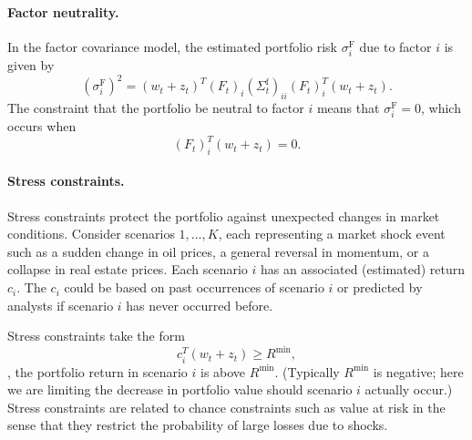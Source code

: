 \documentclass[openany]{article}  %
\newcommand{\cov}{\mathbf{cov}}
\begin{document}
\paragraph{Factor neutrality.}
In the factor covariance model, the estimated
portfolio risk $\sigma^\mathrm{F}_i$ due to factor $i$ is given by
\[
\left( \sigma^\mathrm{F}_i\right)^2
= (w_t + z_t)^T (F_t)_i (\Sigma^\text{f}_t)_{ii} (F_t)_i^T (w_t + z_t).
\]
The constraint that the portfolio be neutral to factor $i$ means that
$\sigma^\mathrm{F}_i = 0$,
which occurs when
\[
(F_t)_i^T (w_t + z_t) = 0.
\]

\paragraph{Stress constraints.}

Stress constraints protect the portfolio against unexpected changes in market
conditions.
Consider scenarios $1,\ldots,K$, each representing a market shock event
such as a sudden change in oil prices,
a general reversal in momentum, or a collapse in real estate prices.
Each scenario $i$ has an associated (estimated) return $c_i$.
The $c_i$ could be based on past occurrences of scenario $i$
or predicted by analysts
if scenario $i$ has never occurred before.

Stress constraints take the form
\[
c_i^T(w_t + z_t) \geq R^\mathrm{min},
\]
\ie, the portfolio return in scenario $i$ is above $R^\mathrm{min}$.
(Typically $R^\mathrm{min}$ is negative; here we are limiting the decrease in portfolio
value should scenario $i$ actually occur.)
Stress constraints are related to chance constraints such as value at risk in the sense that
they restrict the probability of large losses due to shocks.


\end{document}
